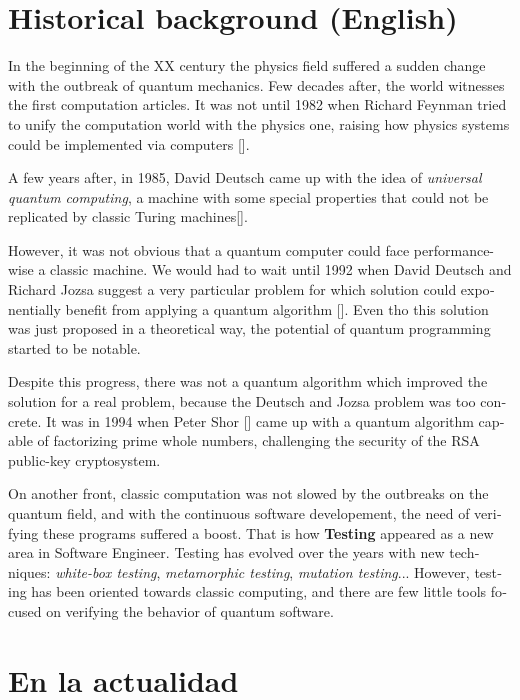 \section{Historical background (English)}
\begin{otherlanguage}{british}
In the beginning of the XX century the physics field suffered a sudden change with the outbreak of quantum mechanics. Few decades after, the world witnesses the first computation articles. It was not until 1982 when Richard Feynman tried to unify the computation world with the physics one, raising how physics systems could be implemented via computers [\cite{feynman1982simulating}].

A few years after, in 1985, David Deutsch came up with the idea of \textit{universal quantum computing}, a machine with some special properties that could not be replicated by classic Turing machines[\cite{deutsch1985quantum}].

However, it was not obvious that a quantum computer could face performance-wise a classic machine. We would had to wait until 1992 when David Deutsch and Richard Jozsa suggest a very particular problem for which solution could exponentially benefit from applying a quantum algorithm [\cite{deutsch1992rapid}]. Even tho this solution was just proposed in a theoretical way, the potential of quantum programming started to be notable.

Despite this progress, there was not a quantum algorithm which improved the solution for a real problem, because the Deutsch and  Jozsa problem was too concrete. It was in 1994 when Peter Shor [\cite{shor1994algorithms}] came up with a quantum algorithm capable of factorizing prime whole numbers, challenging the security of the RSA public-key cryptosystem.

On another front, classic computation was not slowed by the outbreaks on the quantum field, and with the continuous software developement, the need of verifying these programs suffered a boost.
That is how \textbf{Testing} appeared as a new area in Software Engineer. Testing has evolved over the years with new techniques: \textit{white-box testing}, \textit{metamorphic testing}, \textit{mutation testing}... However, testing has been oriented towards classic computing, and there are few little tools focused on verifying the behavior of quantum software.
\end{otherlanguage}

\section{En la actualidad}

